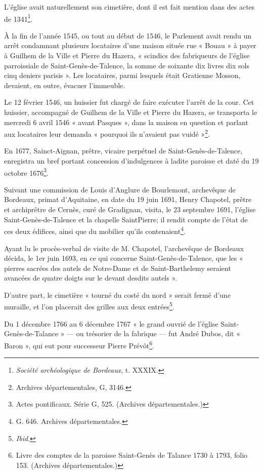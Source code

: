 L'église avait naturellement son cimetière, dont il est fait mention dans des actes de 1341\footnote{\textit{Société archéologique de Bordeaux}, t. XXXIX.}.

À la fin de l'année 1545, ou tout au début de 1546, le Parlement avait rendu un arrêt condamnant plusieurs locataires d'une maison située rue « Bouau » à payer à Guilhem de la Ville et Pierre du Hazera, « scindics des fabriqueurs de l'église parroissiale de Saint-Genès-de-Talence, la somme de soixante dix livres dix sols cinq deniers parisis ». Les locataires, parmi lesquels était Gratienne Mosson, devaient, en outre, évacuer l'immeuble.

Le 12 février 1546, un huissier fut chargé de faire exécuter l'arrêt de la cour. Cet huissier, accompagné de Guilhem de la Ville et Pierre du Hazera, se transporta le mercredi 6 avril 1546 « avant Pasques », dans la maison en question et parlant aux locataires leur demanda « pourquoi ils n'avaient pas vuidé »\footnote{Archives départementales, G, 3146.}.

En 1677, Sainct-Aignan, prêtre, vicaire perpétuel de Saint-Genès-de-Talence, enregistra un bref portant concession d'indulgences à ladite paroisse et daté du 19 octobre 1676\footnote{Actes pontificaux. Série G, 525. (Archives départementales.)}.

Suivant une commission de Louis d'Anglure de Bourlemont, archevêque de Bordeaux, primat d'Aquitaine, en date du 19 juin 1691, Henry Chapotel, prêtre et archiprêtre de Cernès, curé de Gradignan, visita, le 23 septembre 1691, l'église Saint-Genès-de-Talence et la chapelle SaintPierre; il rendit compte de l'état de ces deux édifices, ainsi que du mobilier qu'ils contenaient\footnote{G. 646. Archives départementales.}.

Ayant lu le procès-verbal de visite de M. Chapotel, l'archevêque de Bordeaux décida, le 1er juin 1693, en ce qui concerne Saint-Genès-de-Talence, que les « pierres sacrées des autels de Notre-Dame et de Saint-Barthelemy seraient avancées de quatre doigts sur le devant desdits autels ».

D'autre part, le cimetière « tourné du costé du nord » serait fermé d'une muraille, et l'on placerait des grilles aux deux entrées\footnote{\textit{Ibid}.}.

Du 1\ier{} décembre 1766 au 6 décembre 1767 « le grand ouvrié de l'église Saint-Genès-de-Talance » — ou trésorier de la fabrique — fut André Dubos, dit « Baron », qui eut pour successeur Pierre Prévôt\footnote{Livre des comptes de la paroisse Saint-Genès de Talance 1730 à 1793, folio 153. (Archives départementales.)}.

